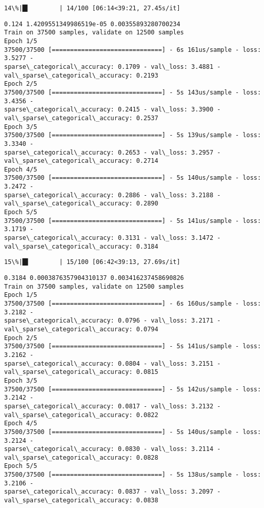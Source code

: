 \documentclass[11pt]{article}
\begin{document}
    \begin{Verbatim}[commandchars=\\\{\}]
 14\%|█▍        | 14/100 [06:14<39:21, 27.45s/it]
    \end{Verbatim}

    \begin{Verbatim}[commandchars=\\\{\}]
0.124 1.4209551349986519e-05 0.00355893280700234
Train on 37500 samples, validate on 12500 samples
Epoch 1/5
37500/37500 [==============================] - 6s 161us/sample - loss: 3.5277 -
sparse\_categorical\_accuracy: 0.1709 - val\_loss: 3.4881 -
val\_sparse\_categorical\_accuracy: 0.2193
Epoch 2/5
37500/37500 [==============================] - 5s 143us/sample - loss: 3.4356 -
sparse\_categorical\_accuracy: 0.2415 - val\_loss: 3.3900 -
val\_sparse\_categorical\_accuracy: 0.2537
Epoch 3/5
37500/37500 [==============================] - 5s 139us/sample - loss: 3.3340 -
sparse\_categorical\_accuracy: 0.2653 - val\_loss: 3.2957 -
val\_sparse\_categorical\_accuracy: 0.2714
Epoch 4/5
37500/37500 [==============================] - 5s 140us/sample - loss: 3.2472 -
sparse\_categorical\_accuracy: 0.2886 - val\_loss: 3.2188 -
val\_sparse\_categorical\_accuracy: 0.2890
Epoch 5/5
37500/37500 [==============================] - 5s 141us/sample - loss: 3.1719 -
sparse\_categorical\_accuracy: 0.3131 - val\_loss: 3.1472 -
val\_sparse\_categorical\_accuracy: 0.3184
    \end{Verbatim}

    \begin{Verbatim}[commandchars=\\\{\}]
 15\%|█▌        | 15/100 [06:42<39:13, 27.69s/it]
    \end{Verbatim}

    \begin{Verbatim}[commandchars=\\\{\}]
0.3184 0.0003876357904310137 0.003416237458690826
Train on 37500 samples, validate on 12500 samples
Epoch 1/5
37500/37500 [==============================] - 6s 160us/sample - loss: 3.2182 -
sparse\_categorical\_accuracy: 0.0796 - val\_loss: 3.2171 -
val\_sparse\_categorical\_accuracy: 0.0794
Epoch 2/5
37500/37500 [==============================] - 5s 141us/sample - loss: 3.2162 -
sparse\_categorical\_accuracy: 0.0804 - val\_loss: 3.2151 -
val\_sparse\_categorical\_accuracy: 0.0815
Epoch 3/5
37500/37500 [==============================] - 5s 142us/sample - loss: 3.2142 -
sparse\_categorical\_accuracy: 0.0817 - val\_loss: 3.2132 -
val\_sparse\_categorical\_accuracy: 0.0822
Epoch 4/5
37500/37500 [==============================] - 5s 140us/sample - loss: 3.2124 -
sparse\_categorical\_accuracy: 0.0830 - val\_loss: 3.2114 -
val\_sparse\_categorical\_accuracy: 0.0828
Epoch 5/5
37500/37500 [==============================] - 5s 138us/sample - loss: 3.2106 -
sparse\_categorical\_accuracy: 0.0837 - val\_loss: 3.2097 -
val\_sparse\_categorical\_accuracy: 0.0838
    \end{Verbatim}
\end{document}
